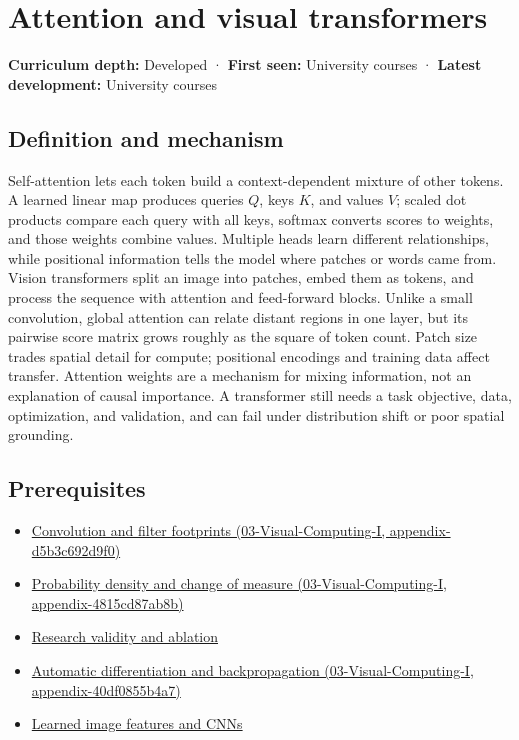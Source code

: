 \hypertarget{appendix-a9d5dfdd164a}{}
\section{Attention and visual transformers}\label{appendix-a9d5dfdd164a-attention-and-visual-transformers}

\textbf{Curriculum depth:} Developed · \textbf{First seen:} University courses · \textbf{Latest development:} University courses

\subsection{Definition and mechanism}\label{appendix-a9d5dfdd164a-definition-and-mechanism}

Self-attention lets each token build a context-dependent mixture of other tokens. A learned linear map produces queries \(Q\), keys \(K\), and values \(V\); scaled dot products compare each query with all keys, softmax converts scores to weights, and those weights combine values. Multiple heads learn different relationships, while positional information tells the model where patches or words came from. Vision transformers split an image into patches, embed them as tokens, and process the sequence with attention and feed-forward blocks. Unlike a small convolution, global attention can relate distant regions in one layer, but its pairwise score matrix grows roughly as the square of token count. Patch size trades spatial detail for compute; positional encodings and training data affect transfer. Attention weights are a mechanism for mixing information, not an explanation of causal importance. A transformer still needs a task objective, data, optimization, and validation, and can fail under distribution shift or poor spatial grounding.

\subsection{Prerequisites}\label{appendix-a9d5dfdd164a-prerequisites}

\begin{itemize}
\tightlist
\item
  \href{../03-Visual-Computing-I/main.pdf\#nameddest=appendix-d5b3c692d9f0}{Convolution and filter footprints (03-Visual-Computing-I, appendix-d5b3c692d9f0)}
\item
  \href{../03-Visual-Computing-I/main.pdf\#nameddest=appendix-4815cd87ab8b}{Probability density and change of measure (03-Visual-Computing-I, appendix-4815cd87ab8b)}
\item
  \hyperref[appendix-65788587ef78]{Research validity and ablation}
\item
  \href{../03-Visual-Computing-I/main.pdf\#nameddest=appendix-40df0855b4a7}{Automatic differentiation and backpropagation (03-Visual-Computing-I, appendix-40df0855b4a7)}
\item
  \hyperref[appendix-47c51ea026fb]{Learned image features and CNNs}
\end{itemize}

